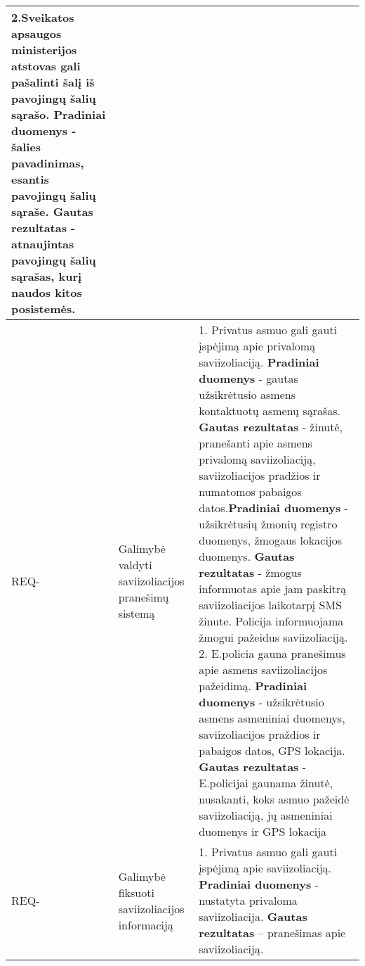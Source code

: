 \documentclass{VUMIFPSkursinis}
\newcounter{counter}
\newcommand{\reqCode}{%
	 \stepcounter{counter}%
	\color{blue} REQ-\thecounter}
\begin{document}
\begin{center}
\begin{longtable}{|C{2cm}|L{5cm}|L{8cm}|}
		{\color{blue} 2.Sveikatos apsaugos ministerijos atstovas gali pašalinti šalį iš pavojingų šalių sąrašo. \textbf{Pradiniai duomenys} - šalies pavadinimas, esantis pavojingų šalių sąraše. \textbf{Gautas rezultatas} - atnaujintas pavojingų šalių sąrašas, kurį naudos kitos posistemės.}                                                                                                                                                                                                                                                                                                                                                                                                                                                                                                             \\ \hline
		\reqCode                                                          &
		Galimybė valdyti saviizoliacijos pranešimų sistemą               &
		{\color{blue} 1. Privatus asmuo gali gauti įspėjimą apie privalomą saviizoliaciją. \textbf{Pradiniai duomenys} - gautas užsikrėtusio asmens kontaktuotų asmenų sąrašas. \textbf{Gautas rezultatas} - žinutė, pranešanti apie asmens privalomą saviizoliaciją, saviizoliacijos pradžios ir numatomos pabaigos datos.}\textbf{Pradiniai duomenys} - užsikrėtusių žmonių registro duomenys, žmogaus lokacijos duomenys. \textbf{Gautas rezultatas} - žmogus informuotas apie jam paskitrą saviizoliacijos laikotarpį SMS žinute. Policija informuojama žmogui pažeidus saviizoliaciją.
		{\color{blue} 2. E.policia gauna pranešimus apie asmens saviizoliacijos pažeidimą. \textbf{Pradiniai duomenys} - užsikrėtusio asmens asmeniniai duomenys, saviizoliacijos praždios ir pabaigos datos, GPS lokacija. \textbf{Gautas rezultatas} - E.policijai gaunama žinutė, nusakanti, koks asmuo pažeidė saviizoliaciją, jų asmeniniai duomenys ir GPS lokacija}                                                                                                                                                                                                                                                                                                                                                                                                                                     \\ \hline
		\reqCode                                                          &
		Galimybė fiksuoti saviizoliacijos informaciją         &
		{\color{blue} 1. Privatus asmuo gali gauti įspėjimą apie saviizoliaciją. \textbf{Pradiniai duomenys} - nustatyta privaloma saviizoliacija. \textbf{Gautas rezultatas} -- pranešimas apie saviizoliaciją.}

\end{longtable}
\end{center}
\end{document}
